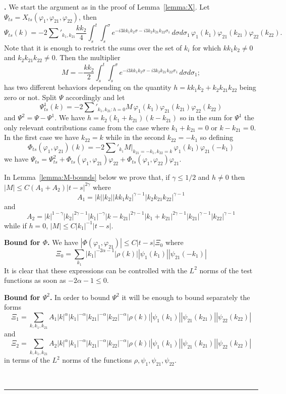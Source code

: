 \documentclass[a4paper,12pt,reqno]{article}
\newenvironment{proof}[1][Proof]{\textbf{#1.} }{\ \rule{0.5em}{0.5em}}
\begin{document}
\begin{proof}[]
We start the argument  as in the proof of Lemma~\ref{lemma:X}.
Let $\Psi_{ts}=X_{ts}(\varphi_1,\varphi_{21},\varphi_{22})$, then
$$
\Psi_{ts}(k) = - 2 \sum'_{k_1,k_{21}}  \frac{k k_2}4  \int_s^t  \int_s^\sigma e^{-i 3
  k k_1 k_2 \sigma
- i 3 k_2 k_{21} k_{22} \sigma_1}
 \, d\sigma   d\sigma_1\,  \varphi_1(k_1)   \varphi_{21}(k_{21})  \varphi_{22}(k_{22}).
$$  
Note that it is enough to restrict the sums over the set of $k_i$ for  which $k k_1 k_2 \neq 0$ and $k_2 k_{21} k_{22}\neq 0$. Then
the multiplier
\begin{equation}
  \label{eq:M-mult}
M = -   \frac{k k_2}2  \int_s^t  \int_s^\sigma e^{-i 3
  k k_1 k_2 \sigma
- i 3 k_2 k_{21} k_{22} \sigma_1} \, d\sigma   d\sigma_1;  
\end{equation}
has two different behaviors depending on the quantity $h = k k_1 k_2 + k_2 k_{21} k_{22}$ being zero or not. 
Split $\Psi$ accordingly and let
$$
\Psi^1_{ts}(k) = - 2 \sum'_{k_1,k_{21}: h= 0} M \,  \varphi_1(k_1)   \varphi_{21}(k_{21})  \varphi_{22}(k_{22})  
$$  
and $\Psi^2 = \Psi - \Psi^1$. We have $h=k_2(k_1+k_{21})(k-k_{21})$ so in the sum for $\Psi^1$ the only relevant contributions came from the case where $k_1+k_{21}=0$ or $k-k_{21}=0$. In the first case we have $k_{22}=k$ while in the second $k_{22}=-k_1$ so defining
$$
\Phi_{ts}(\varphi_1,\varphi_{21})(k) = - 2 \sum'_{k_1} M|_{k_{21}=-k_1,k_{22}=k} \,  \varphi_1(k_1)   \varphi_{21}(-k_{1})  
$$
we have $\Psi_{ts} = \Psi^{2}_{ts} + \Phi_{ts}(\varphi_1,\varphi_{21}) \varphi_{22} + \Phi_{ts}(\varphi_1,\varphi_{22}) \varphi_{21} $.

In Lemma~\ref{lemma:M-bounds} below we prove that, if $\gamma \le 1/2$ and $h \neq 0$ then
$
|M| \le C (A_1+A_2)  |t-s|^{2\gamma} 
$
where 
$$
A_1 = |k| |k_2| |k k_1 k_2|^{\gamma-1} |k_2 k_{21} k_{22}|^{\gamma-1}
$$
and
$$
A_2 = |k|^{1-\gamma} |k_2|^{2\gamma-1} |k_1|^{-\gamma}
|k-k_{21}|^{2\gamma-1} 
|k_1+k_{21}|^{2\gamma-1} |k_{21}|^{\gamma-1} |k_{22}|^{\gamma-1}
$$
while if $h=0$,
$
|M| \le C |k_1|^{-1}  |t-s| 
$.

\textbf{Bound for $\Phi$.}
We have
 $|\Phi(\varphi_1,\varphi_{21})| \le C |t-s| \Xi_0$ where
\begin{equation*}
\Xi_0 =  \sum_{k_1} |k_1|^{-2\alpha-1} |\rho(k)| |\psi_1(k_1)| |\psi_{21}(-k_1)|
\end{equation*}
It is clear that these expressions can be controlled with the $L^2$ norms of the test functions as soon as $-2\alpha-1 \le 0$.

\textbf{Bound for $\Psi^2$.}
In order to bound $\Psi^2$ it will be enough to bound separately
the forms
$$
\Xi_1 = \sum_{k,k_1,k_{21}} A_1 |k|^{\alpha} |k_1|^{-\alpha}
|k_{21}|^{-\alpha} |k_{22}|^{-\alpha} |\rho(k)| |\psi_1 (k_1)|   |\psi_{21}(k_{21})|  |\psi_{22}(k_{22})|  
$$
and
$$
\Xi_2 = \sum_{k,k_1,k_{21}} A_2 |k|^{\alpha} |k_1|^{-\alpha}
|k_{21}|^{-\alpha} |k_{22}|^{-\alpha} |\rho(k)| |\psi_1(k_1)|   |\psi_{21}(k_{21})|  |\psi_{22}(k_{22})|  
$$
in terms of the $L^2$ norms of the functions $\rho,\psi_1,\psi_{21},\psi_{22}$.


\end{proof}
\end{document}
